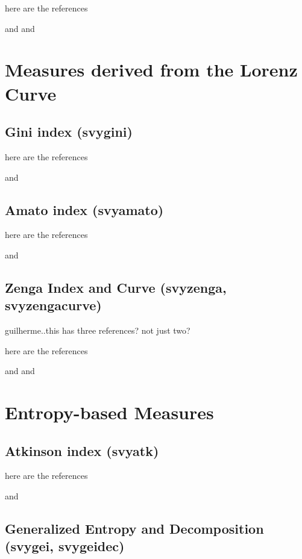 \documentclass[]{book}
\begin{document}
here are the references

\citep{kovacevic1997} and \citep{lerman1989} and \citep{langel2012}

\section{Measures derived from the Lorenz
Curve}\label{measures-derived-from-the-lorenz-curve}

\subsection{Gini index (svygini)}\label{gini-index-svygini}

here are the references

\citep{osier2009} and \citep{deville1999}

\subsection{Amato index (svyamato)}\label{amato-index-svyamato}

here are the references

\citep{barabesi2016} and \citep{arnold2012}

\subsection{Zenga Index and Curve (svyzenga,
svyzengacurve)}\label{zenga-index-and-curve-svyzenga-svyzengacurve}

guilherme..this has three references? not just two?

here are the references

\citep{barabesi2016} and \citep{langel2012} and \citep{deville1999}

\section{Entropy-based Measures}\label{entropy-based-measures}

\subsection{Atkinson index (svyatk)}\label{atkinson-index-svyatk}

here are the references

\citep{langel2012} and \citep{biewen2003}

\subsection{Generalized Entropy and Decomposition (svygei,
svygeidec)}\label{generalized-entropy-and-decomposition-svygei-svygeidec}
\end{document}
